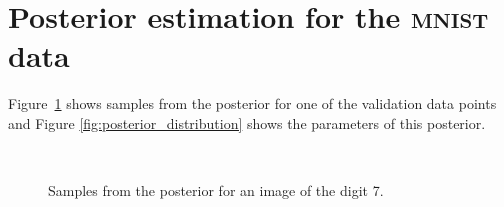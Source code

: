 \documentclass{article}
\begin{document}
\section{Posterior estimation for the \textsc{mnist} data}
Figure~\ref{fig:posterior_samples} shows samples from the posterior for one of the validation data points and Figure \ref{fig:posterior_distribution} shows the parameters of this posterior.

\begin{figure}[t]
\centering
{}~
~
\caption{Samples from the posterior for an image of the digit 7.}
\label{fig:posterior_samples}
\end{figure}
\end{document}

